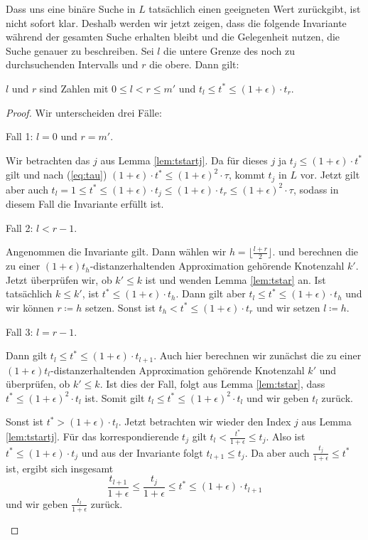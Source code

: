 Dass uns eine binäre Suche in $L$ tatsächlich einen geeigneten Wert zurückgibt, ist nicht sofort klar. Deshalb werden wir jetzt zeigen, dass die folgende Invariante während der gesamten Suche erhalten bleibt und die Gelegenheit nutzen, die Suche genauer zu beschreiben. Sei $l$ die untere Grenze des noch zu durchsuchenden Intervalls und $r$ die obere. Dann gilt:

\begin{invariant}
	\label{lem:invariantmdps}
	$l$ und $r$ sind Zahlen mit $0 \leq l < r \leq m'$ und $t_l \leq t^* \leq (1 + \epsilon)\cdot t_r$.
\end{invariant}
\begin{proof}
	Wir unterscheiden drei Fälle:
	\begin{description}[topsep=0mm, itemsep=0mm]
		\item{Fall 1:} $l = 0$ und $r = m'$.
		
		Wir betrachten das $j$ aus Lemma \ref{lem:tstartj}. 
		Da für dieses $j$ ja $t_j \leq (1 + \epsilon) \cdot t^* $ gilt und nach (\ref{eq:tau}) $(1 + \epsilon) \cdot t^*\leq (1 + \epsilon)^2 \cdot \tau$, kommt $t_j$ in $L$ vor. 
		Jetzt gilt aber auch $t_l = 1 
		\leq t^* 
		\leq (1 + \epsilon) \cdot t_j 
		\leq (1 + \epsilon) \cdot t_r 
		\leq (1 + \epsilon)^2 \cdot \tau$, sodass in diesem Fall die Invariante erfüllt ist.
		
		\item{Fall 2:} 
		$l < r-1$.
		
		Angenommen die Invariante gilt. Dann wählen wir $h = \lfloor \frac{l + r}{2} \rfloor$. 
		und berechnen die zu einer $(1 + \epsilon)t_h$-distanzerhaltenden Approximation gehörende Knotenzahl $k'$. 
		Jetzt überprüfen wir, ob $k' \leq k$ ist und wenden Lemma \ref{lem:tstar} an.
		Ist tatsächlich $k \leq k'$, ist $t^* \leq (1 + \epsilon) \cdot t_h$. 
		Dann gilt aber $t_l \leq t^* \leq  (1 + \epsilon) \cdot t_h$ und wir können $r \coloneqq h$ setzen. 
		Sonst ist $t_h < t^* \leq (1 + \epsilon)\cdot t_r$ und wir setzen $l \coloneqq h$.
		
		\item{Fall 3:} $l = r - 1$.
		
		Dann gilt $t_l \leq t^* \leq (1 + \epsilon)\cdot t_{l+1}$. 
		Auch hier berechnen wir zunächst die zu einer $(1 + \epsilon)t_l$-distanzerhaltenden Approximation gehörende Knotenzahl $k'$ und überprüfen, ob $k' \leq k$.
		Ist dies der Fall, folgt aus Lemma \ref{lem:tstar}, dass $t^* \leq (1 + \epsilon)^2 \cdot t_l$ ist. 
		Somit gilt $t_l \leq t^* \leq (1 + \epsilon)^2 \cdot t_l$ und wir geben $t_l$ zurück.
		
		Sonst ist $t^* > (1 + \epsilon)\cdot t_l$. 
		Jetzt betrachten wir wieder den Index $j$ aus Lemma \ref{lem:tstartj}. 
		Für das korrespondierende $t_j$ gilt $t_l < \frac{t^*}{1 + \epsilon} \leq t_j$. Also ist $t^* \leq (1 + \epsilon) \cdot t_j$ und aus der Invariante folgt $t_{l+1} \leq t_j$.
		Da aber auch $\frac{t_j}{1 + \epsilon} \leq t^*$ ist, ergibt sich insgesamt 
		\[
		\frac{t_{l+1}}{1 + \epsilon} 
		\leq \frac{t_j}{1 + \epsilon} 
		\leq t^* 
		\leq (1 + \epsilon) \cdot t_{l+1}
		\]
		und wir geben $\frac{t_l}{1 + \epsilon}$ zurück.
	\end{description}
\end{proof}

